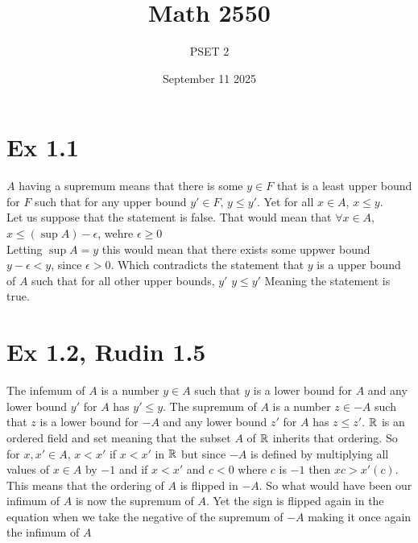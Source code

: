 \documentclass{report}
\title{\Huge{Math 2550}}
\author{\huge{PSET 2}}
\date{September 11 2025}
\begin{document}
\maketitle
\newpage%
\tableofcontents
\pagebreak

\section*{Ex 1.1}

\begin{proofWithHibiscus}
  $A$ having a supremum means that there is some $y \in F$ that is a least upper bound for 
  $F$ such that for any upper bound $y' \in F$, $y \leq y'$. Yet for all $x \in A$, $x \leq y$. \\
  Let us suppose that the statement is false. That would mean that $\forall x \in A$, $x \leq (\sup A) - \epsilon$, wehre $\epsilon \geq 0$ \\
  Letting $\sup A = y$ this would mean that there exists some uppwer bound $y - \epsilon < y$, since $\epsilon > 0$. 
  Which contradicts the statement that $y$ is a upper bound of $A$ such that for all other upper bounds, $y'$ $y \leq y'$ Meaning the statement is true. 
\end{proofWithHibiscus}


\section*{Ex 1.2, Rudin 1.5}


\begin{proofWithHibiscus}
  The infemum of $A$ is a number $y \in A$ such that $y$ is a lower bound for $A$ and any lower bound $y'$ 
  for $A$ has $y' \leq y$. The supremum of $A$ is a number $z \in -A$ such that $z$ is a lower bound for $-A$ and any lower bound 
  $z'$ for $A$ has $z \leq z'$. $\mathbb{R}$ is an ordered field and set meaning that the subset $A$ of $\mathbb{R}$
  inherits that ordering. So for $x, x' \in A$, $x < x'$ if $x < x'$ in $\mathbb{R}$ but since $-A$ is defined by multiplying all 
  values of $x \in A$ by $-1$ and if $x < x'$ and $c < 0$ where $c$ is $-1$ then $xc > x'(c)$. This means that the ordering of 
  $A$ is flipped in $-A$. So what would have been our infimum of $A$ is now the supremum of $A$. Yet the sign is flipped again 
  in the equation when we take the negative of the supremum of $-A$ making it once again the infimum of $A$ 
\end{proofWithHibiscus}
\end{document}
